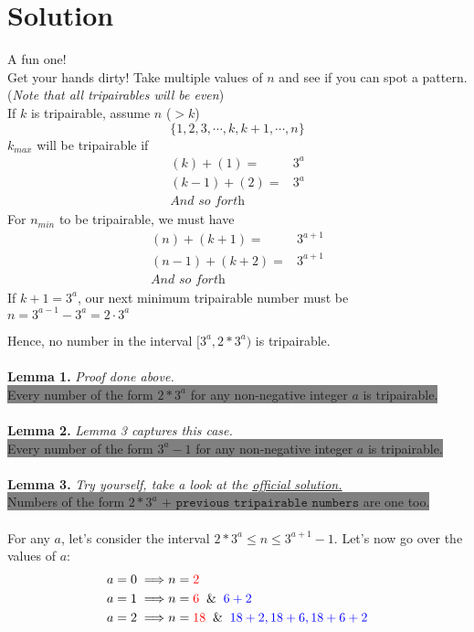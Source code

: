\documentclass[12pt, letterpaper]{article}
\begin{document}
\section*{Solution}
A fun one! \\
\colorbox{Dandelion}{Get your hands dirty! Take multiple values of $n$ and see if you can spot a pattern.}
{(\textit{Note that all tripairables will be even})}\\
If $k$ is tripairable, assume $n$ ($>k$) \[
\{1,2,3,\cdots,k,k+1,\cdots,n\}
\]
$k_{max}$ will be tripairable if 
\begin{align*}
    (k)+(1) = &3^a \\
    (k-1)+(2)=&3^a\\
    \textit{And so forth}
\end{align*}
For $n_{min}$ to be tripairable, we must have
\begin{align*}
    (n)+(k+1) = &3^{a+1} \\
    (n-1)+(k+2)=&3^{a+1}\\
    \textit{And so forth}
\end{align*}
If $k+1=3^a$, our next minimum tripairable number must be $n=3^{a-1}-3^a=2\cdot3^a$

Hence, no number in the interval $[3^a, 2*3^{a})$ is tripairable.\\\\
\textbf{\color{red}Lemma 1.} \textit{Proof done above.}\\
\colorbox{Gray}{Every number of the form $2*3^a$ for any non-negative integer $a$ is tripairable.}\\\\
\textbf{\color{green!70}Lemma 2.} \textit{Lemma 3 captures this case.}\\
\colorbox{Gray}{Every number of the form $3^a-1$ for any non-negative integer $a$ is tripairable.}\\\\
\textbf{\color{blue}Lemma 3.} \textit{Try yourself, take a look at the \href{https://www.simonmarais.org/uploads/8/2/3/5/82358688/smmc_2024_solutions.pdf}{\color{orange}official solution.}}\\
\colorbox{Gray}{Numbers of the form $2*3^a \texttt{ + previous tripairable numbers}$ are one too.}
\\\\
For any $a$, let's consider the interval $2*3^a\leq n\leq3^{a+1}-1$.
Let's now go over the values of $a$:
\begin{align}
    a=0 \implies& n={\color{red}2} \\
    a=1 \implies& n={\color{red}6} \And {\color{blue}6+2} \\
    a=2 \implies& n={\color{red}18} \And {\color{blue}18+2,18+6,18+6+2}
\end{align}
\end{document}
